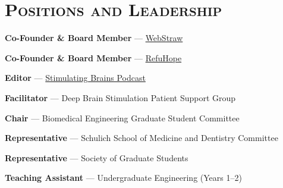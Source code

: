 
\vspace{0.5em}
\section*{\textsc{Positions and Leadership}} \noindent\hrulefill \vspace{0.5em}
  \item \textbf{Co-Founder \& Board Member} — \href{https://webstraw.ca}{WebStraw}
  \item \textbf{Co-Founder \& Board Member} — \href{https://refuhope.com}{RefuHope}
  \item \textbf{Editor} — \href{https://stimulatingbrains.org}{Stimulating Brains Podcast}
  \item \textbf{Facilitator} — Deep Brain Stimulation Patient Support Group
  \item \textbf{Chair} — Biomedical Engineering Graduate Student Committee
  \item \textbf{Representative} — Schulich School of Medicine and Dentistry Committee
  \item \textbf{Representative} — Society of Graduate Students
  \item \textbf{Teaching Assistant} — Undergraduate Engineering (Years 1–2)

\vspace{0.5em}
